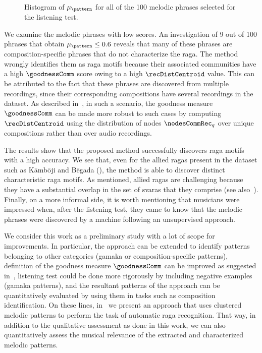 {\begin{figure}
\begin{center}
		\fi
	\end{center}
	\caption[Histogram of mean musician ratings for all of the 100 melodic phrases]{Histogram of $\mu_\pattern$ for all of the 100 melodic phrases selected for the listening test.}
	\label{fig:average_rating_histogram_pattern_characterization}
\end{figure}



We examine the melodic phrases with low scores. An investigation of 9 out of 100 phrases that obtain $\mu_\pattern\leq0.6$ reveals that many of these phrases are composition-specific phrases that do not characterize the \gls{raga}. The method wrongly identifies them as \gls{raga} motifs because their associated communities have a high $\goodnessComm$ score owing to a high $\recDistCentroid$ value. This can be attributed to the fact that these phrases are discovered from multiple recordings, since their corresponding compositions have several recordings in the dataset. As described in~, in such a scenario, the goodness measure $\goodnessComm$ can be made more robust to such cases by computing $\recDistCentroid$ using the distribution of nodes ${{\nodesCommRec}_q}$ over unique compositions rather than over audio recordings.

The results show that the proposed method successfully discovers \gls{raga} motifs with a high accuracy. We see that, even for the allied \glspl{raga} present in the dataset such as K\={a}mb\={o}ji and B\={e}gada (), the method is able to discover distinct characteristic \gls{raga} motifs. As mentioned, allied \glspl{raga} are challenging because they have a substantial overlap in the set of \glspl{svara} that they comprise (see also~). Finally, on a more informal side, it is worth mentioning that musicians were impressed when, after the listening test, they came to know that the melodic phrases were discovered by a machine following an unsupervised approach. 





We consider this work as a preliminary study with a lot of scope for improvements. In particular, the approach can be extended to identify patterns belonging to other categories (\gls{gamaka} or composition-specific patterns), definition of the goodness measure $\goodnessComm$ can be improved as suggested in~, listening test could be done more rigorously by including negative examples (\gls{gamaka} patterns), and the resultant patterns of the approach can be quantitatively evaluated by using them in tasks such as composition identification. On these lines, in~ we present an approach that uses clustered melodic patterns to perform the task of automatic \gls{raga} recognition. That way, in addition to the qualitative assessment as done in this work, we can also quantitatively assess the musical relevance of the extracted and characterized melodic patterns.



}
